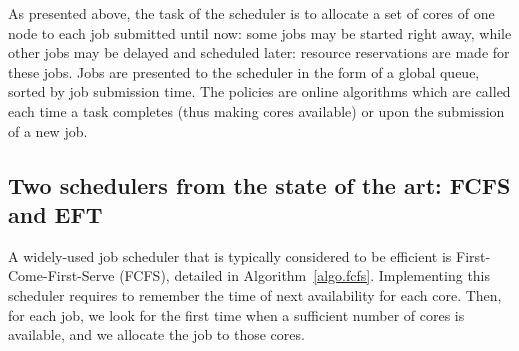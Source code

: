\documentclass[conference,10pt]{IEEEtran}
\begin{document}
As presented above, the task of the scheduler is to allocate a set of
cores of one node
to each job submitted until now: some jobs may be started right away,
while other jobs may be delayed and scheduled later: resource
reservations are made for these jobs. Jobs are presented to the
scheduler in the form of a global queue, sorted by job submission
time. The policies are online algorithms which are called each time
a task completes (thus making cores available) or upon the submission of
a new job.






\subsection{Two schedulers from the state of the art: FCFS and EFT}\label{subsec.fcfs_eft}

A widely-used job scheduler that is typically considered to be efficient is
First-Come-First-Serve (FCFS), detailed in
Algorithm~\ref{algo.fcfs}. Implementing this scheduler requires to
remember the time of next availability for each core. Then, for each job, we look
for the first time when a sufficient number of cores is available, and we allocate the job to
those cores.
\end{document}
